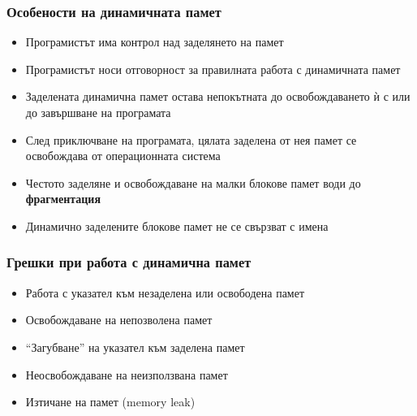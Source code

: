 \documentclass{beamer}
\begin{document}
\begin{frame}
  \frametitle{Особености на динамичната памет}

  \begin{itemize}[<+->]
  \item Програмистът има контрол над заделянето на памет
  \item Програмистът носи отговорност за правилната работа с динамичната памет
  \item Заделената динамична памет остава непокътната до освобождаването ѝ с  или до завършване на програмата
  \item След приключване на програмата, цялата заделена от нея памет се освобождава от операционната система
  \item Честото заделяне и освобождаване на малки блокове памет води до \textbf{фрагментация}
    \begin{center}
      \small
    \end{center}
  \item Динамично заделените блокове памет не се свързват с имена
  \end{itemize}
\end{frame}

\begin{frame}
  \frametitle{Грешки при работа с динамична памет}

  \begin{itemize}[<+->]
  \item Работа с указател към незаделена или освободена памет
  \item Освобождаване на непозволена памет
  \item ``Загубване'' на указател към заделена памет
  \item Неосвобождаване на неизползвана памет
  \item Изтичане на памет (memory leak)
  \end{itemize}
\end{frame}
\end{document}
